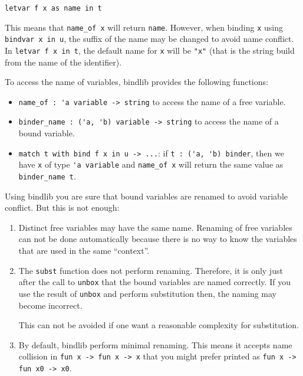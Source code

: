 \documentclass[11pt]{article}
\begin{document}
\begin{verbatim}
letvar f x as name in t
\end{verbatim}

This means that \verb#name_of x# will return \verb#name#. However,
when binding \verb#x# using \verb#bindvar x in u#, the suffix of
the name may be changed to avoid name conflict. In
\verb#letvar f x in t#, the default name for \verb#x# will be
\verb#"x"# (that is the string build from the name of the identifier).

To access the name of variables, bindlib provides the following
functions:

\begin{itemize}
\item \verb#name_of : 'a variable -> string# to access the name of a free
  variable.

\item \verb#binder_name : ('a, 'b) variable -> string# to access the
  name of a bound variable.

\item \verb#match t with bind f x in u -> ...#: if
 \verb#t : ('a, 'b) binder#, then we have \verb#x# of type \verb#'a variable# and
 \verb#name_of x# will return the same value as \verb#binder_name t#.
\end{itemize}

Using bindlib you are sure that bound variables are renamed to avoid
variable conflict. But this is not enough:
\begin{enumerate}
\item Distinct free variables may have the same name. Renaming of free
  variables can not be done automatically because there is no way to
  know the variables that are used in the same ``context''.
\item The \verb#subst# function does not perform renaming. Therefore,
  it is only just after the call to \verb#unbox# that the bound
  variables are named correctly. If you use the result of \verb#unbox#
  and perform substitution then, the naming may become incorrect.

  This can not be avoided if one want a reasonable complexity for
  substitution.

\item By default, bindlib perform minimal renaming. This means it
  accepts name collision in \verb#fun x -> fun x -> x# that you might prefer printed as
\verb#fun x -> fun x0 -> x0#.
\end{enumerate}
\end{document}
